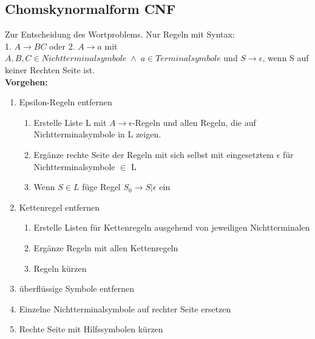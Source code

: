 \documentclass[12pt,a4paper]{article}
\begin{document}
	\subsection{Chomskynormalform CNF}
	Zur Entscheidung des Wortproblems. Nur Regeln mit Syntax: \\
	1. $A \rightarrow BC$ oder 2. $A \rightarrow a$ mit $A,B,C \in Nichtterminalsymbole \; \wedge \; a \in Terminalsymbole$ und $S \rightarrow \epsilon$, wenn S auf keiner Rechten Seite ist.\\
	\textbf{Vorgehen:}
	\begin{enumerate}
		\item Epsilon-Regeln entfernen
		\begin{enumerate}
			\item Erstelle Liste L mit $A\rightarrow \epsilon$-Regeln und allen Regeln, die auf Nichtterminalsymbole in L zeigen.
			\item Ergänze rechte Seite der Regeln mit sich selbst mit eingesetztem $\epsilon$ für Nichtterminalsymbole $\in$ L
			\item Wenn $S \in L$ füge Regel $S_0 \rightarrow S | \epsilon$ ein
		\end{enumerate}
		\item Kettenregel entfernen
		\begin{enumerate}
			\item Erstelle Listen für Kettenregeln ausgehend von jeweiligen Nichtterminalen
			\item Ergänze Regeln mit allen Kettenregeln
			\item Regeln kürzen
		\end{enumerate}
		\item überflüssige Symbole entfernen
		\item Einzelne Nichtterminalsymbole auf rechter Seite ersetzen 
		\item Rechte Seite mit Hilfssymbolen kürzen
	\end{enumerate}
\end{document}
